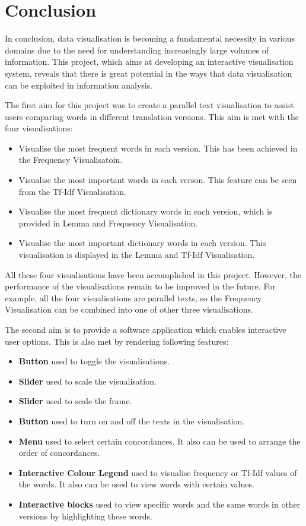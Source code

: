 \section{Conclusion}
In conclusion, data visualisation is becoming a fundamental necessity in various domains due to the need for understanding increasingly large volumes of information. This project, which aims at developing an interactive visualisation system, reveals that there is great potential in the ways that data visualisation can be exploited in information analysis. 

The first aim for this project was to create a parallel text visualisation to assist users comparing words in different translation versions. This aim is met with the four visualisations:
\begin{itemize}
	\item \textbf{} Visualise the most frequent words in each version. This has been achieved in the Frequency Visualisatoin.
	\item \textbf{} Visualise the most important words in each verson. This feature can be seen from the Tf-Idf Visualisation.
	\item \textbf{} Visualise the most frequent dictionary words in each version, which is provided in Lemma and Frequency Visualisation.
	\item \textbf{} Visualise the most important dictionary words in each version. This visualisation is displayed in the Lemma and Tf-Idf Visualisation.
\end{itemize}
All these four visualisations have been accomplished in this project. However, the performance of the visualisations remain to be improved in the future. For example, all the four visualisations are parallel texts, so the Frequency Visualisation can be combined into one of other three visualisations.  

The second aim is to provide a software application which enables interactive user options. This is also met by rendering following features:
\begin{itemize}
	\item \textbf{Button} used to toggle the visualisations. 
	\item \textbf{Slider} used to scale the visualisation.
	\item \textbf{Slider} used to scale the frame.
	\item \textbf{Button} used to turn on and off the texts in the visualisation.
	\item \textbf{Menu} used to select certain concordances. It also can be used to arrange the order of concordances.
	\item \textbf{Interactive Colour Legend} used to visualise frequency or Tf-Idf values of the words. It also can be used to view words with certain values.
	\item \textbf{Interactive blocks} used to view specific words and the same words in other versions by highlighting these words.	
\end{itemize}

